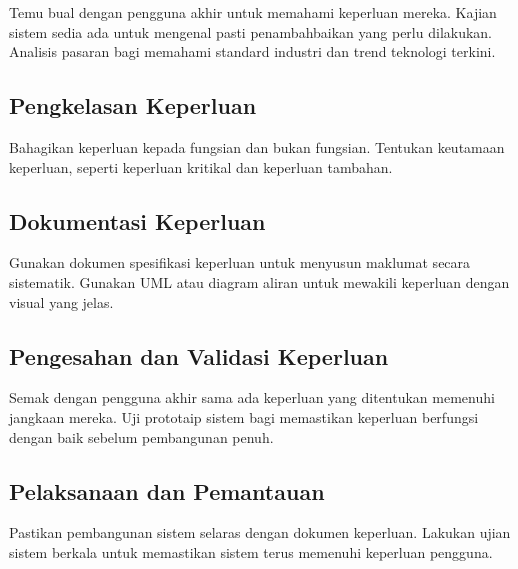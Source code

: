  Temu bual dengan pengguna akhir untuk memahami keperluan mereka.  Kajian sistem sedia ada untuk mengenal pasti penambahbaikan yang perlu dilakukan. Analisis pasaran bagi memahami standard industri dan trend teknologi terkini.

\subsection{ Pengkelasan Keperluan}

 Bahagikan keperluan kepada fungsian dan bukan fungsian. Tentukan keutamaan keperluan, seperti keperluan kritikal dan keperluan tambahan.

\subsection{Dokumentasi Keperluan}
 Gunakan dokumen spesifikasi keperluan untuk menyusun maklumat secara sistematik. Gunakan UML atau diagram aliran untuk mewakili keperluan dengan visual yang jelas.

\subsection{Pengesahan dan Validasi Keperluan}
 Semak dengan pengguna akhir sama ada keperluan yang ditentukan memenuhi jangkaan mereka.  Uji prototaip sistem bagi memastikan keperluan berfungsi dengan baik sebelum pembangunan penuh.

\subsection{Pelaksanaan dan Pemantauan}
 Pastikan pembangunan sistem selaras dengan dokumen keperluan. Lakukan ujian sistem berkala untuk memastikan sistem terus memenuhi keperluan pengguna.


